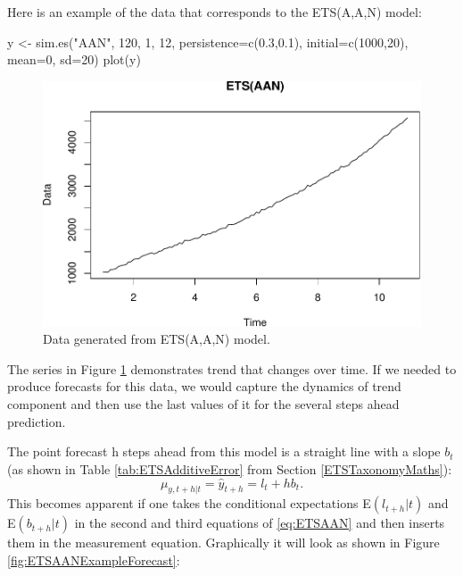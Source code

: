 \documentclass[
]{book}
\newenvironment{Shaded}{\begin{snugshade}}{\end{snugshade}}
\newcommand{\AttributeTok}[1]{\textcolor[rgb]{0.77,0.63,0.00}{#1}}
\newcommand{\DecValTok}[1]{\textcolor[rgb]{0.00,0.00,0.81}{#1}}
\newcommand{\FloatTok}[1]{\textcolor[rgb]{0.00,0.00,0.81}{#1}}
\newcommand{\FunctionTok}[1]{\textcolor[rgb]{0.00,0.00,0.00}{#1}}
\newcommand{\NormalTok}[1]{#1}
\newcommand{\OtherTok}[1]{\textcolor[rgb]{0.56,0.35,0.01}{#1}}
\newcommand{\StringTok}[1]{\textcolor[rgb]{0.31,0.60,0.02}{#1}}
\theoremstyle{definition}
\theoremstyle{definition}
\theoremstyle{definition}
\theoremstyle{definition}
\theoremstyle{remark}
\begin{document}
Here is an example of the data that corresponds to the ETS(A,A,N) model:

\begin{Shaded}
\begin{Highlighting}[]
\NormalTok{y }\OtherTok{\textless{}{-}} \FunctionTok{sim.es}\NormalTok{(}\StringTok{"AAN"}\NormalTok{, }\DecValTok{120}\NormalTok{, }\DecValTok{1}\NormalTok{, }\DecValTok{12}\NormalTok{, }\AttributeTok{persistence=}\FunctionTok{c}\NormalTok{(}\FloatTok{0.3}\NormalTok{,}\FloatTok{0.1}\NormalTok{),}
            \AttributeTok{initial=}\FunctionTok{c}\NormalTok{(}\DecValTok{1000}\NormalTok{,}\DecValTok{20}\NormalTok{), }\AttributeTok{mean=}\DecValTok{0}\NormalTok{, }\AttributeTok{sd=}\DecValTok{20}\NormalTok{)}
\FunctionTok{plot}\NormalTok{(y)}
\end{Highlighting}
\end{Shaded}

\begin{figure}
\centering
\includegraphics{adam_files/figure-latex/ETSAANExample-1.pdf}
\caption{\label{fig:ETSAANExample}Data generated from ETS(A,A,N) model.}
\end{figure}

The series in Figure \ref{fig:ETSAANExample} demonstrates trend that changes over time. If we needed to produce forecasts for this data, we would capture the dynamics of trend component and then use the last values of it for the several steps ahead prediction.

The point forecast h steps ahead from this model is a straight line with a slope \(b_t\) (as shown in Table \ref{tab:ETSAdditiveError} from Section \ref{ETSTaxonomyMaths}):
\begin{equation}
    \mu_{y,t+h|t} = \hat{y}_{t+h} = l_{t} + h b_t.
  \label{eq:ETSAANForecast}
\end{equation}
This becomes apparent if one takes the conditional expectations E\((l_{t+h}|t)\) and E\((b_{t+h}|t)\) in the second and third equations of \eqref{eq:ETSAAN} and then inserts them in the measurement equation. Graphically it will look as shown in Figure \ref{fig:ETSAANExampleForecast}:
\end{document}
